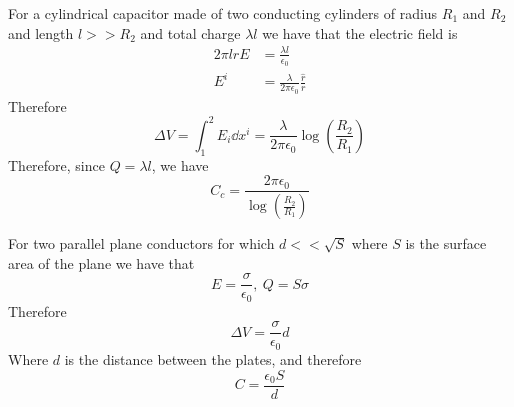 \documentclass[../electromagnetism]{subfiles}
\begin{document}
\begin{eg}
	For a cylindrical capacitor made of two conducting cylinders of radius $R_1$ and $R_2$ and length $l>>R_2$ and total charge $\lambda l$ we have that the electric field is
	\begin{equation*}
		\begin{aligned}
			2\pi lrE&=\frac{\lambda l}{\epsilon_0}\\
			E^i&=\frac{\lambda}{2\pi\epsilon_0}\frac{\hat{r}}{r}
		\end{aligned}
	\end{equation*}
	Therefore
	\begin{equation*}
		\Delta V=\int_{1}^{2}E_i\dd x^i=\frac{\lambda}{2\pi\epsilon_0}\log\left( \frac{R_2}{R_1} \right)
	\end{equation*}
	Therefore, since $Q=\lambda l$, we have
	\begin{equation}
		C_c=\frac{2\pi\epsilon_0}{\log\left( \frac{R_2}{R_1} \right)}
		\label{eq:cylcap}
	\end{equation}
\end{eg}
\begin{eg}
	For two parallel plane conductors for which $d<<\sqrt{S}$ where $S$ is the surface area of the plane we have that
	\begin{equation*}
		E=\frac{\sigma}{\epsilon_0},\ Q=S\sigma
	\end{equation*}
	Therefore
	\begin{equation*}
		\Delta V=\frac{\sigma}{\epsilon_0}d
	\end{equation*}
	Where $d$ is the distance between the plates, and therefore
	\begin{equation}
		C=\frac{\epsilon_0S}{d}
		\label{eq:parallelplane}
	\end{equation}
\end{eg}
\end{document}
